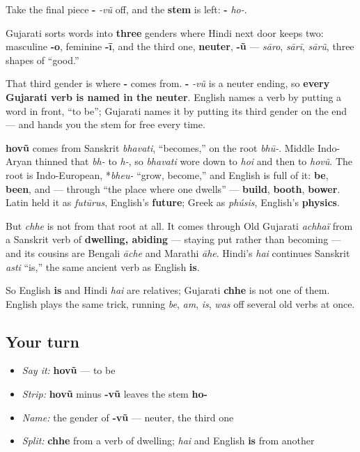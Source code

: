 Take the final piece \textbf{-} \emph{-vũ} off, and the \textbf{stem} is left: \textbf{-} \emph{ho-}.

\begin{grammarlens}[title={Grammar Lens: the ending is a neuter}]
Gujarati sorts words into \textbf{three} genders where Hindi next door keeps two: masculine \textbf{-o}, feminine \textbf{-ī}, and the third one, \textbf{neuter}, \textbf{-ũ} — \emph{sāro}, \emph{sārī}, \emph{sārũ}, three shapes of \textquotedblleft{}good.\textquotedblright{}

That third gender is where \textbf{-} comes from. \textbf{-} \emph{-vũ} is a neuter ending, so \textbf{every Gujarati verb is named in the neuter}. English names a verb by putting a word in front, \textquotedblleft{}to be\textquotedblright{}; Gujarati names it by putting its third gender on the end — and hands you the stem for free every time.
\end{grammarlens}

\begin{cousinweb}
\textbf{hovũ} comes from Sanskrit \emph{bhavati}, \textquotedblleft{}becomes,\textquotedblright{} on the root \emph{bhū-}. Middle Indo-Aryan thinned that \emph{bh-} to \emph{h-}, so \emph{bhavati} wore down to \emph{hoi} and then to \emph{hovũ}. The root is Indo-European, *\emph{bheu-} \textquotedblleft{}grow, become,\textquotedblright{} and English is full of it: \textbf{be}, \textbf{been}, and — through \textquotedblleft{}the place where one dwells\textquotedblright{} — \textbf{build}, \textbf{booth}, \textbf{bower}. Latin held it as \emph{futūrus}, English's \textbf{future}; Greek as \emph{phúsis}, English's \textbf{physics}.

But \textbf{} \emph{chhe} is not from that root at all. It comes through Old Gujarati \emph{achhaï} from a Sanskrit verb of \textbf{dwelling, abiding} — staying put rather than becoming — and its cousins are Bengali \emph{āche} and Marathi \emph{āhe}. Hindi's \emph{hai} continues Sanskrit \emph{asti} \textquotedblleft{}is,\textquotedblright{} the same ancient verb as English \textbf{is}.

So English \textbf{is} and Hindi \emph{hai} are relatives; Gujarati \textbf{chhe} is not one of them. English plays the same trick, running \emph{be}, \emph{am}, \emph{is}, \emph{was} off several old verbs at once.
\end{cousinweb}

\subsection*{Your turn}
\begin{itemize}
\raggedright
  \item \emph{Say it:} \textbf{hovũ} — to be
  \item \emph{Strip:} \textbf{hovũ} minus \textbf{-vũ} leaves the stem \textbf{ho-}
  \item \emph{Name:} the gender of \textbf{-vũ} — neuter, the third one
  \item \emph{Split:} \textbf{chhe} from a verb of dwelling; \emph{hai} and English \textbf{is} from another
\end{itemize}

